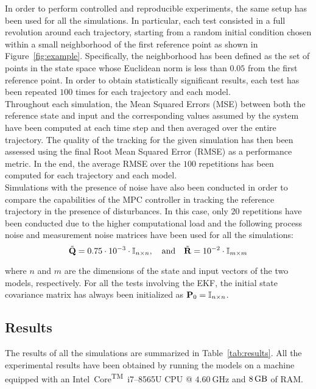 \documentclass[../main.tex]{subfiles}
\begin{document}
In order to perform controlled and reproducible experiments, the same setup has
been used for all the simulations. In particular, each test consisted in a full
revolution around each trajectory, starting from a random initial condition
chosen within a small neighborhood of the first reference point as shown in
Figure~\ref{fig:example}. Specifically,
the neighborhood has been defined as the set of points in the state space whose
Euclidean norm is less than $0.05$ from the first reference point. In order to
obtain statistically significant results, each test has been repeated $100$
times for each trajectory and each model.\\
Throughout each simulation, the Mean Squared Errors (MSE) between both the
reference state and input 
and the corresponding values assumed by the system have been computed at each time step and then averaged over
the entire trajectory. The quality of the tracking for the given simulation has
then been assessed using the final Root Mean Squared Error (RMSE) as a
performance metric. In the end, the average RMSE over the $100$ repetitions has
been computed for each trajectory and each model.\\
Simulations with the presence of noise have also been conducted in order to
compare the capabilities of the MPC controller in tracking the reference
trajectory in the presence of disturbances. In this case, only $20$ repetitions
have been conducted due to the higher computational load and the following process
noise and measurement noise matrices have been used for all the simulations:
\begin{equation*}
	\tilde{\mathbf{Q}} = 0.75 \cdot 10^{-3} \cdot \mathbb{I}_{n \times n},
	\quad \text{and} \quad
	\tilde{\mathbf{R}} = 10^{-2} \cdot \mathbb{I}_{m \times m}
\end{equation*}

where $n$ and $m$ are the dimensions of the state and input vectors of the two
models, respectively. For all the tests involving the EKF, the initial state
covariance matrix has always been initialized as $\mathbf{P}_0 = \mathbb{I}_{n \times
n}$.

\pagebreak
\subsection{Results}

The results of all the simulations are summarized in Table~\ref{tab:results}.
All the experimental results have been obtained by running the models on a machine equipped with an Intel\textsuperscript{\textregistered}~Core\textsuperscript{TM}~i7--8565U CPU @ $\SI{4.60}{\giga\hertz}$ and $\SI{8}{\giga\byte}$ of RAM.\\
\end{document}
